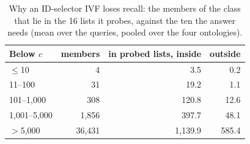 \begin{table}[t]
\caption{Why an ID-selector IVF loses recall: the members of the class that lie in the 16 lists it probes, against the ten the answer needs (mean over the queries, pooled over the four ontologies).}
\label{tab-mechanism}
\small
\begin{tabular}{@{}lrrr@{}}
\toprule
Below $c$ & members & in probed lists, inside & outside \\
\midrule
$\le$10 & 4 & 3.5 & 0.2 \\
11--100 & 31 & 19.2 & 1.1 \\
101--1,000 & 308 & 120.8 & 12.6 \\
1,001--5,000 & 1,856 & 397.7 & 48.1 \\
$>$5,000 & 36,431 & 1,139.9 & 585.4 \\
\bottomrule
\end{tabular}
\end{table}
